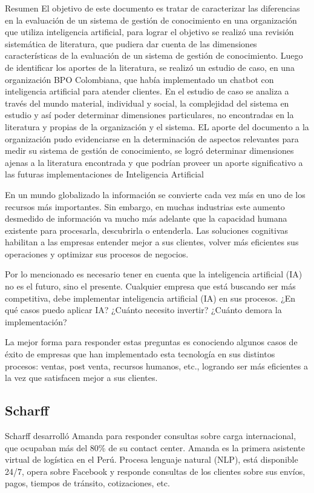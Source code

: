 Resumen El objetivo de este documento es tratar de caracterizar las diferencias en la evaluación de un sistema de gestión de conocimiento en una organización que utiliza inteligencia artificial, para lograr el objetivo se realizó una revisión sistemática de literatura, que pudiera dar cuenta de las dimensiones características de la evaluación de un sistema de gestión de conocimiento. Luego de identificar los aportes de la literatura, se realizó un estudio de caso, en una organización BPO Colombiana, que había implementado un chatbot con inteligencia artificial para atender clientes. En el estudio de caso se analiza a través del mundo material, individual y social, la complejidad del sistema en estudio y así poder determinar dimensiones particulares, no encontradas en la literatura y propias de la organización y el sistema. EL aporte del documento a la organización pudo evidenciarse en la determinación de aspectos relevantes para medir su sistema de gestión de conocimiento, se logró determinar dimensiones ajenas a la literatura encontrada y que podrían proveer un aporte significativo a las futuras implementaciones de Inteligencia Artificial

En un mundo globalizado la información se convierte cada vez más en uno de los recursos más importantes. Sin embargo, en muchas industrias este aumento desmedido de información va mucho más adelante que la capacidad humana existente para procesarla, descubrirla o entenderla. Las soluciones cognitivas habilitan a las empresas entender mejor a sus clientes, volver más eficientes sus operaciones y optimizar sus procesos de negocios.

Por lo mencionado es necesario tener en cuenta que la inteligencia artificial (IA) no es el futuro, sino el presente. Cualquier empresa que está buscando ser más competitiva, debe implementar inteligencia artificial (IA) en sus procesos. ¿En qué casos puedo aplicar IA? ¿Cuánto necesito invertir? ¿Cuánto demora la implementación?

La mejor forma para responder estas preguntas es conociendo algunos casos de éxito de empresas que han implementado esta tecnología en sus distintos procesos: ventas, post venta, recursos humanos, etc., logrando ser más eficientes a la vez que satisfacen mejor a sus clientes.

\subsection{Scharff}

Scharff desarrolló Amanda para responder consultas sobre carga internacional, que ocupaban más del 80\% de su contact center. Amanda es la primera asistente virtual de logística en el Perú. Procesa lenguaje natural (NLP), está disponible 24/7, opera sobre Facebook y responde consultas de los clientes sobre sus envíos, pagos, tiempos de tránsito, cotizaciones, etc.

